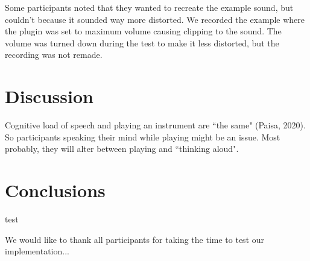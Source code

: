 \documentclass[dvipsnames, pdftex]{article}
\begin{document}
Some participants noted that they wanted to recreate the example sound, but couldn't because it sounded way more distorted. We recorded the example where the plugin was set to maximum volume causing clipping to the sound. The volume was turned down during the test to make it less distorted, but the recording was not remade.

\section{Discussion}\label{sec:discussion}
Cognitive load of speech and playing an instrument are ``the same" (Paisa, 2020). So participants speaking their mind while playing might be an issue. Most probably, they will alter between playing and ``thinking aloud". 

\section{Conclusions}
test

\begin{acknowledgments}
We would like to thank all participants for taking the time to test our implementation...
\end{acknowledgments} 


\end{document}
